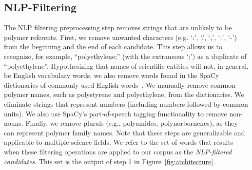 \subsection{NLP-Filtering}\label{sec:filter}

The NLP filtering preprocessing step removes strings that are unlikely to be polymer referents. 
First, we remove
unwanted characters (e.g. `:', `.', `,', `:', `-') from the beginning and the end of each
candidate.  
This step allows us to recognize, for example, ``polyethylene;'' (with the extraneous `;') 
as a duplicate of ``polyethylene''. 
Hypothesizing that names of scientific entities will not, in general, be English
vocabulary words, we also remove words found in the SpaCy dictionaries
of commonly used English words~\cite{choi2015depends}. We manually remove common polymer
names, such as polystyrene and polyethylene, from the dictionaries.
We eliminate strings that represent numbers (including numbers followed by common units).
We also use
SpaCy's part-of-speech tagging functionality to remove non-nouns.  
Finally, we remove plurals (e.g.,
polyamides, polynorbornenes), as they can represent polymer family names.
Note that these steps are generalizable and applicable to multiple science fields.
We refer to the set of words that results when these filtering operations are applied to our corpus 
as the \emph{NLP-filtered candidates}.
This set is the output of step 1 in Figure~\ref{fig:architecture}.

